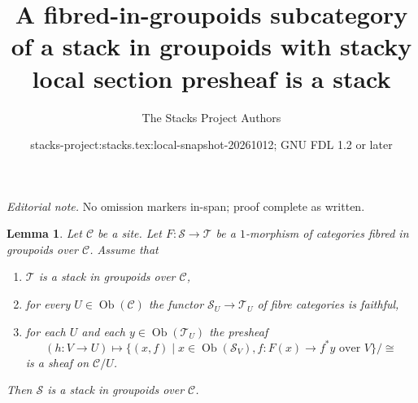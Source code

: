 \documentclass{stacks-project}
\title{A fibred-in-groupoids subcategory of a stack in groupoids with stacky local section presheaf is a stack}
\author{The Stacks Project Authors}
\date{stacks-project:stacks.tex:local-snapshot-20261012; GNU FDL 1.2 or later}
\theoremstyle{plain}
\newtheorem{lemma}[subsection]{Lemma}
\theoremstyle{definition}
\theoremstyle{remark}
\numberwithin{equation}{subsection}
\def\Ob{\mathop{\mathrm{Ob}}\nolimits}
\begin{document}
\maketitle
\noindent\textit{Editorial note.} No omission markers in-span; proof complete as written.\par\medskip
\begin{lemma}
\label{lemma-relative-sheaf-over-stack-is-stack}
Let $\mathcal{C}$ be a site. Let $F : \mathcal{S} \to \mathcal{T}$
be a $1$-morphism of categories fibred in groupoids over $\mathcal{C}$.
Assume that
\begin{enumerate}
\item $\mathcal{T}$ is a stack in groupoids over $\mathcal{C}$,
\item for every $U \in \Ob(\mathcal{C})$ the functor
$\mathcal{S}_U \to \mathcal{T}_U$ of fibre categories is faithful,
\item for each $U$ and each $y \in \Ob(\mathcal{T}_U)$ the presheaf
$$
(h : V \to U)
\longmapsto
\{(x, f) \mid x \in \Ob(\mathcal{S}_V), f : F(x) \to f^*y\text{ over }V\}/\cong
$$
is a sheaf on $\mathcal{C}/U$.
\end{enumerate}
Then $\mathcal{S}$ is a stack in groupoids over $\mathcal{C}$.
\end{lemma}
\end{document}
